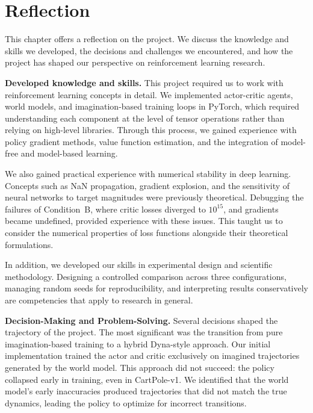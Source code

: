 \chapter{Reflection}
\label{ch:reflection}

This chapter offers a reflection on the project. We discuss the knowledge and skills we developed, the decisions and challenges we encountered, and how the project has shaped our perspective on reinforcement learning research.

\bigskip

\noindent\textbf{Developed knowledge and skills.}
This project required us to work with reinforcement learning concepts in detail. We implemented actor-critic agents, world models, and imagination-based training loops in PyTorch, which required understanding each component at the level of tensor operations rather than relying on high-level libraries. Through this process, we gained experience with policy gradient methods, value function estimation, and the integration of model-free and model-based learning.

We also gained practical experience with numerical stability in deep learning. Concepts such as NaN propagation, gradient explosion, and the sensitivity of neural networks to target magnitudes were previously theoretical. Debugging the failures of Condition~B, where critic losses diverged to $10^{15}$, and gradients became undefined, provided experience with these issues. This taught us to consider the numerical properties of loss functions alongside their theoretical formulations.

In addition, we developed our skills in experimental design and scientific methodology. Designing a controlled comparison across three configurations, managing random seeds for reproducibility, and interpreting results conservatively are competencies that apply to research in general.

\bigskip

\noindent\textbf{Decision-Making and Problem-Solving.}
Several decisions shaped the trajectory of the project. The most significant was the transition from pure imagination-based training to a hybrid Dyna-style approach. Our initial implementation trained the actor and critic exclusively on imagined trajectories generated by the world model. This approach did not succeed: the policy collapsed early in training, even in CartPole-v1. We identified that the world model's early inaccuracies produced trajectories that did not match the true dynamics, leading the policy to optimize for incorrect transitions.

